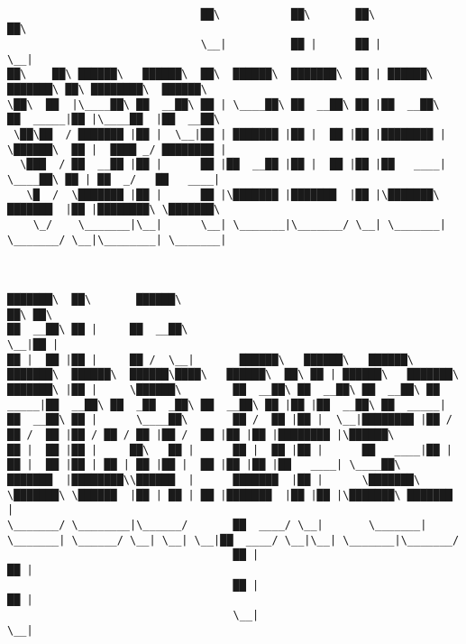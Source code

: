 \documentclass[varwidth=\maxdimen,margin=0.5cm,multi={verbatim}]{standalone}
\begin{document}
\begin{verbatim}

                              ██\           ██\       ██\                           ██\
                              \__|          ██ |      ██ |                          \__|
██\    ██\ ██████\   ██████\  ██\  ██████\  ███████\  ██ | ██████\         ███████\ ██\ ████████\  ██████\
\██\  ██  |\____██\ ██  __██\ ██ | \____██\ ██  __██\ ██ |██  __██\       ██  _____|██ |\____██  |██  __██\
 \██\██  / ███████ |██ |  \__|██ | ███████ |██ |  ██ |██ |████████ |      \██████\  ██ |  ████ _/ ████████ |
  \███  / ██  __██ |██ |      ██ |██  __██ |██ |  ██ |██ |██   ____|       \____██\ ██ | ██  _/   ██   ____|
   \█  /  \███████ |██ |      ██ |\███████ |███████  |██ |\███████\       ███████  |██ |████████\ \███████\
    \_/    \_______|\__|      \__| \_______|\_______/ \__| \_______|      \_______/ \__|\________| \_______|



███████\  ██\       ██████\                                                                                  ██\ ██\
██  __██\ ██ |     ██  __██\                                                                                 \__|██ |
██ |  ██ |██ |     ██ /  \__|       ██████\   ██████\   ██████\   ███████\  ██████\  ██████\████\   ██████\  ██\ ██ | ██████\   ███████\
███████\ |██ |     \██████\        ██  __██\ ██  __██\ ██  __██\ ██  _____|██  __██\ ██  _██  _██\ ██  __██\ ██ |██ |██  __██\ ██  _____|
██  __██\ ██ |      \____██\       ██ /  ██ |██ |  \__|████████ |██ /      ██ /  ██ |██ / ██ / ██ |██ /  ██ |██ |██ |████████ |\██████\
██ |  ██ |██ |     ██\   ██ |      ██ |  ██ |██ |      ██   ____|██ |      ██ |  ██ |██ | ██ | ██ |██ |  ██ |██ |██ |██   ____| \____██\
███████  |████████\\██████  |      ███████  |██ |      \███████\ \███████\ \██████  |██ | ██ | ██ |███████  |██ |██ |\███████\ ███████  |
\_______/ \________|\______/       ██  ____/ \__|       \_______| \_______| \______/ \__| \__| \__|██  ____/ \__|\__| \_______|\_______/
                                   ██ |                                                            ██ |
                                   ██ |                                                            ██ |
                                   \__|                                                            \__|



\end{verbatim}
\end{document}
